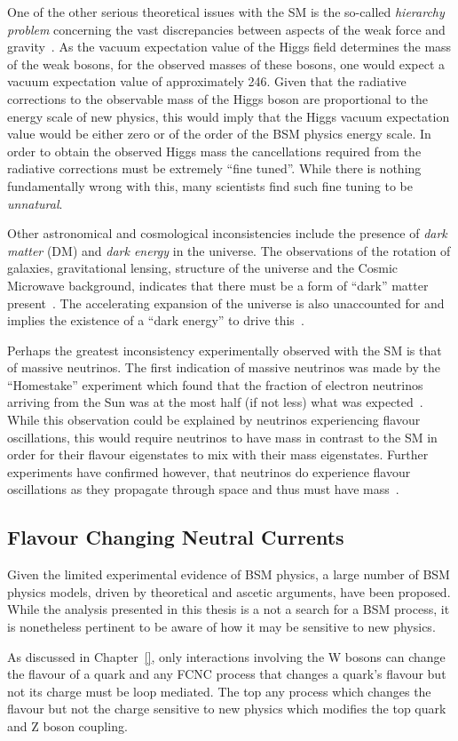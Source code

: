 One of the other serious theoretical issues with the SM is the so-called \emph{hierarchy problem} concerning the vast discrepancies between aspects of the weak force and gravity~\cite{Burdman:2007ck}.
As the vacuum expectation value of the Higgs field determines the mass of the weak bosons, for the observed masses of these bosons, one would expect a vacuum expectation value of approximately 246\GeV.
Given that the radiative corrections to the observable mass of the Higgs boson are proportional to the energy scale of new physics, this would imply that the Higgs vacuum expectation value would be either zero or of the order of the BSM physics energy scale.
In order to obtain the observed Higgs mass the cancellations required from the radiative corrections must be extremely ``fine tuned''.
While there is nothing fundamentally wrong with this, many scientists find such fine tuning to be \emph{unnatural}.

Other astronomical and cosmological inconsistencies include the presence of \emph{dark matter} (DM) and \emph{dark energy} in the universe.
The observations of the rotation of galaxies, gravitational lensing, structure of the universe and the Cosmic Microwave background, indicates that there must be a form of ``dark'' matter present~\cite{Aghanim:2018eyx}.
The accelerating expansion of the universe is also unaccounted for and implies the existence of a ``dark energy'' to drive this~\cite{Peebles:2002gy,Aghanim:2018eyx}.

Perhaps the greatest inconsistency experimentally observed with the SM is that of massive neutrinos.
The first indication of massive neutrinos was made by the ``Homestake'' experiment which found that the fraction of electron neutrinos arriving from the Sun was at the most half (if not less) what was expected~\cite{PhysRevLett.20.1205}.
While this observation could be explained by neutrinos experiencing flavour oscillations, this would require neutrinos to have mass in contrast to the SM in order for their flavour eigenstates to mix with their mass eigenstates.
Further experiments have confirmed however, that neutrinos do experience flavour oscillations as they propagate through space and thus must have mass~\cite{Fukuda:1998mi,Ahmad:2001an,PhysRevD.88.032002}.

\subsection{Flavour Changing Neutral Currents}\label{sec:fcncs}
Given the limited experimental evidence of BSM physics, a large number of BSM physics models, driven by theoretical and ascetic arguments, have been proposed.
While the analysis presented in this thesis is a not a search for a BSM process, it is nonetheless pertinent to be aware of how it may be sensitive to new physics.

As discussed in Chapter~\ref{}, only interactions involving the W bosons can change the flavour of a quark and any FCNC process that changes a quark's flavour but not its charge must be loop mediated.
The top 
any process which changes the flavour but not the charge 
sensitive to new physics which modifies the top quark and Z boson coupling.

